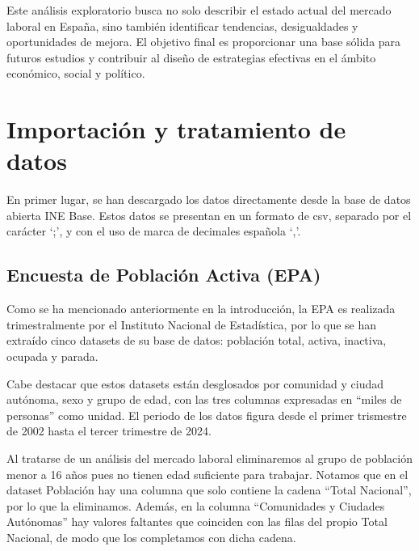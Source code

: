 \documentclass[notspecified,article,submit,moreauthors,pdftex]{Definitions/mdpi}
\begin{document}
Este análisis exploratorio busca no solo describir el estado actual del
mercado laboral en España, sino también identificar tendencias,
desigualdades y oportunidades de mejora. El objetivo final es
proporcionar una base sólida para futuros estudios y contribuir al
diseño de estrategias efectivas en el ámbito económico, social y
político.

\section{Importación y tratamiento de
datos}\label{importaciuxf3n-y-tratamiento-de-datos}

En primer lugar, se han descargado los datos directamente desde la base
de datos abierta INE Base. Estos datos se presentan en un formato de
csv, separado por el carácter `;', y con el uso de marca de decimales
española `,'.

\subsection{Encuesta de Población Activa
(EPA)}\label{encuesta-de-poblaciuxf3n-activa-epa}

Como se ha mencionado anteriormente en la introducción, la EPA es
realizada trimestralmente por el Instituto Nacional de Estadística, por
lo que se han extraído cinco datasets de su base de datos: población
total, activa, inactiva, ocupada y parada.

Cabe destacar que estos datasets están desglosados por comunidad y
ciudad autónoma, sexo y grupo de edad, con las tres columnas expresadas
en ``miles de personas'' como unidad. El periodo de los datos figura
desde el primer trismestre de 2002 hasta el tercer trimestre de 2024.

Al tratarse de un análisis del mercado laboral eliminaremos al grupo de
población menor a 16 años pues no tienen edad suficiente para trabajar.
Notamos que en el dataset Población hay una columna que solo contiene la
cadena ``Total Nacional'', por lo que la eliminamos. Además, en la
columna ``Comunidades y Ciudades Autónomas'' hay valores faltantes que
coinciden con las filas del propio Total Nacional, de modo que los
completamos con dicha cadena.
\end{document}
